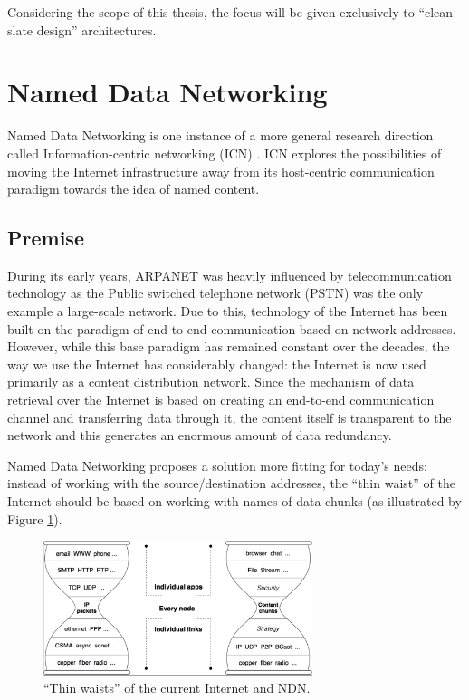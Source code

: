         Considering the scope of this thesis, the focus will be given exclusively to ``clean-slate design'' architectures.

    \section{Named Data Networking}\label{archs:ndn}

        Named Data Networking is one instance of a more general research direction called Information-centric networking (ICN) \cite{icn}. ICN explores the possibilities of moving the Internet infrastructure away from its host-centric communication paradigm towards the idea of named content.

        \subsection{Premise}

            During its early years, ARPANET was heavily influenced by telecommunication technology as the Public switched telephone network (PSTN) was the only example a large-scale network. Due to this, technology of the Internet has been built on the paradigm of end-to-end communication based on network addresses. However, while this base paradigm has remained constant over the decades, the way we use the Internet has considerably changed: the Internet is now used primarily as a content distribution network. Since the mechanism of data retrieval over the Internet is based on creating an end-to-end communication channel and transferring data through it, the content itself is transparent to the network and this generates an enormous amount of data redundancy.

            Named Data Networking proposes a solution more fitting for today's needs: instead of working with the source/destination addresses, the ``thin waist'' of the Internet should be based on working with names of data chunks (as illustrated by Figure \ref{fig:ndn_waist}).

            \begin{figure}[H]
                \begin{center}
                    \includegraphics[width=0.7\textwidth]{fig/archs_ndn-hourglass.png}
                  \caption{``Thin waists'' of the current Internet and NDN.}
                  \label{fig:ndn_waist}
                \end{center}
            \end{figure}

